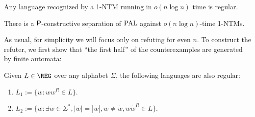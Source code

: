\begin{theorem}
Any language recognized by a 1-NTM running in $o(n \log n)$ time is regular.
\end{theorem}

\begin{theorem}
\label{thm:regularrefuter}
There is a $\mathsf{P}$-constructive separation of $\mathrm{PAL}$ against $o(n \log n)$-time 1-NTMs. 
\end{theorem}

As usual, for simplicity we will focus only on refuting for even $n$. To construct the refuter, we first show that
``the first half'' of the counterexamples are generated by finite automata:

\begin{lemma}
\label{lem:regularlang}
Given $L \in \REG$ over any alphabet $\Sigma$, the following languages are also regular:
\begin{enumerate}
    \item $L_1 := \{w : ww^R \in L\}$.
    \item $L_2 := \{w : \exists \tilde{w} \in \Sigma^*, |w| = |\tilde{w}|, w \neq \tilde{w}, w\tilde{w}^R \in L\}$.
\end{enumerate}
\end{lemma}
